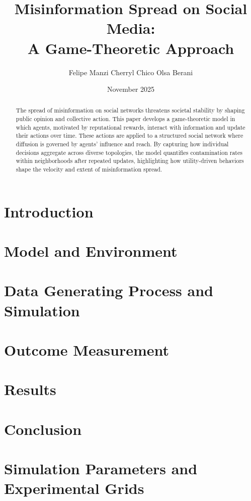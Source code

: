 

\title{Misinformation Spread on Social Media: \\ A Game-Theoretic Approach}   
\author{Felipe Manzi Cherryl Chico Olsa Berani}
\date{November 2025}




\maketitle
\begin{abstract}
The spread of misinformation on social networks threatens societal stability by shaping public opinion and collective action. This paper develops a game-theoretic model in which agents, motivated by reputational rewards, interact with information and update their actions over time. These actions are applied to a structured social network where diffusion is governed by agents’ influence and reach. By capturing how individual decisions aggregate across diverse topologies, the model quantifies contamination rates within neighborhoods after repeated updates, highlighting how utility-driven behaviors shape the velocity and extent of misinformation spread.

\end{abstract}

\section{Introduction}


\section{Model and Environment}


\section{Data Generating Process and Simulation}


\section{Outcome Measurement}


\section{Results}


\section{Conclusion}


\appendix
\section{Simulation Parameters and Experimental Grids}









